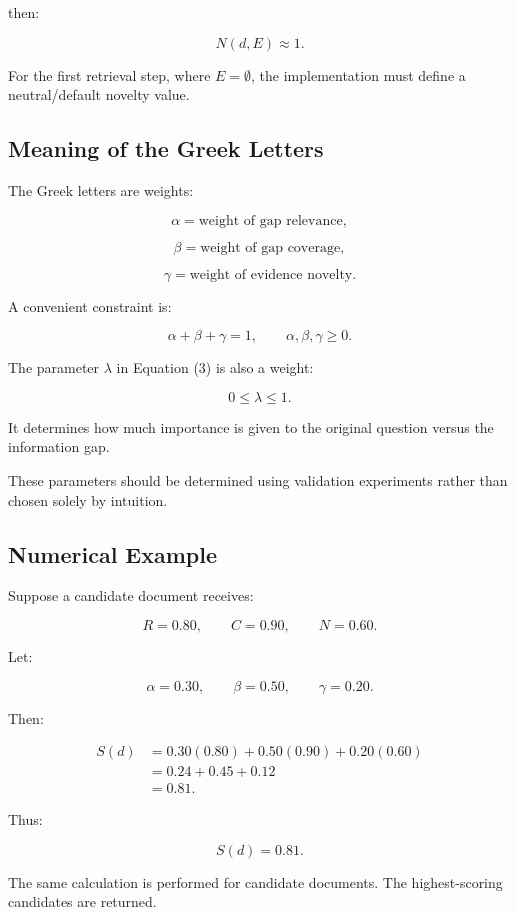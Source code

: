 \documentclass[11pt,a4paper]{article}
\begin{document}
then:

\[
N(d,E)\approx1.
\]

For the first retrieval step, where $E=\emptyset$, the implementation must define a neutral/default novelty value.

\subsection{Meaning of the Greek Letters}

The Greek letters are weights:

\[
\alpha=\text{weight of gap relevance},
\]

\[
\beta=\text{weight of gap coverage},
\]

\[
\gamma=\text{weight of evidence novelty}.
\]

A convenient constraint is:

\[
\boxed{
\alpha+\beta+\gamma=1,
\qquad
\alpha,\beta,\gamma\geq0.
}
\tag{8}
\]

The parameter $\lambda$ in Equation (3) is also a weight:

\[
0\leq\lambda\leq1.
\]

It determines how much importance is given to the original question versus the information gap.

These parameters should be determined using validation experiments rather than chosen solely by intuition.

\subsection{Numerical Example}

Suppose a candidate document receives:

\[
R=0.80,\qquad C=0.90,\qquad N=0.60.
\]

Let:

\[
\alpha=0.30,\qquad
\beta=0.50,\qquad
\gamma=0.20.
\]

Then:

\begin{align*}
S(d)
&=0.30(0.80)+0.50(0.90)+0.20(0.60)\\
&=0.24+0.45+0.12\\
&=0.81.
\end{align*}

Thus:

\[
\boxed{S(d)=0.81}.
\]

The same calculation is performed for candidate documents. The highest-scoring candidates are returned.
\end{document}
